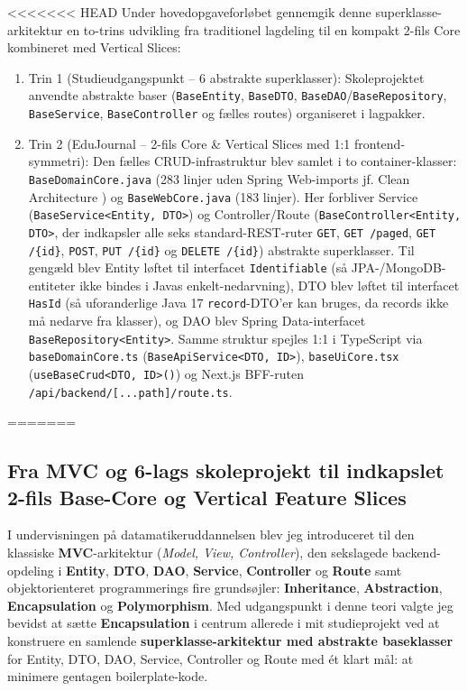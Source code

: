 \documentclass[11pt,a4paper]{article}
\begin{document}
\begin{table}[htbp]
<<<<<<< HEAD
Under hovedopgaveforløbet gennemgik denne superklasse-arkitektur en to-trins udvikling fra traditionel lagdeling til en kompakt 2-fils Core kombineret med Vertical Slices:
\begin{enumerate}[noitemsep]
    \item Trin 1 (Studieudgangspunkt -- 6 abstrakte superklasser): Skoleprojektet anvendte abstrakte baser (\texttt{BaseEntity}, \texttt{BaseDTO}, \texttt{BaseDAO}/\texttt{BaseRepository}, \texttt{BaseService}, \texttt{BaseController} og fælles routes) organiseret i lagpakker.
    \item Trin 2 (EduJournal -- 2-fils Core \& Vertical Slices med 1:1 frontend-symmetri): Den fælles CRUD-infrastruktur blev samlet i to container-klasser: \texttt{BaseDomainCore.java} (283 linjer uden Spring Web-imports jf. Clean Architecture \cite{martin2017}) og \texttt{BaseWebCore.java} (183 linjer). Her forbliver Service (\texttt{BaseService<Entity, DTO>}) og Controller/Route (\texttt{BaseController<Entity, DTO>}, der indkapsler alle seks standard-REST-ruter \texttt{GET}, \texttt{GET /paged}, \texttt{GET /\{id\}}, \texttt{POST}, \texttt{PUT /\{id\}} og \texttt{DELETE /\{id\}}) abstrakte superklasser. Til gengæld blev Entity løftet til interfacet \texttt{Identifiable} (så JPA-/MongoDB-entiteter ikke bindes i Javas enkelt-nedarvning), DTO blev løftet til interfacet \texttt{HasId} (så uforanderlige Java 17 \texttt{record}-DTO'er kan bruges, da records ikke må nedarve fra klasser), og DAO blev Spring Data-interfacet \texttt{BaseRepository<Entity>}. Samme struktur spejles 1:1 i TypeScript via \texttt{baseDomainCore.ts} (\texttt{BaseApiService<DTO, ID>}), \texttt{baseUiCore.tsx} (\texttt{useBaseCrud<DTO, ID>()}) og Next.js BFF-ruten \texttt{/api/backend/[...path]/route.ts}.
\end{enumerate}
=======
\subsection{Fra MVC og 6-lags skoleprojekt til indkapslet 2-fils Base-Core og Vertical Feature Slices}
I undervisningen på datamatikeruddannelsen blev jeg introduceret til den klassiske \textbf{MVC}-arkitektur (\textit{Model, View, Controller}), den sekslagede backend-opdeling i \textbf{Entity}, \textbf{DTO}, \textbf{DAO}, \textbf{Service}, \textbf{Controller} og \textbf{Route} samt objektorienteret programmerings fire grundsøjler: \textbf{Inheritance}, \textbf{Abstraction}, \textbf{Encapsulation} og \textbf{Polymorphism}. Med udgangspunkt i denne teori valgte jeg bevidst at sætte \textbf{Encapsulation} i centrum allerede i mit studieprojekt ved at konstruere en samlende \textbf{superklasse-arkitektur med abstrakte baseklasser} for Entity, DTO, DAO, Service, Controller og Route med ét klart mål: at minimere gentagen boilerplate-kode.


\end{table}
\end{document}
